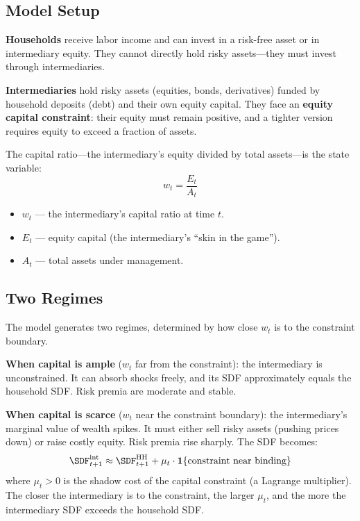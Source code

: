 \subsection{Model Setup}

\textbf{Households} receive labor income and can invest in a risk-free asset or in intermediary equity. They cannot directly hold risky assets---they must invest through intermediaries.

\textbf{Intermediaries} hold risky assets (equities, bonds, derivatives) funded by household deposits (debt) and their own equity capital. They face an \textbf{equity capital constraint}: their equity must remain positive, and a tighter version requires equity to exceed a fraction of assets.

The capital ratio---the intermediary's equity divided by total assets---is the state variable:
\begin{equation}
w_t = \frac{E_t}{A_t}
\label{eq:capital-ratio-hk}
\end{equation}
\begin{itemize}[nosep]
  \item $w_t$ --- the intermediary's capital ratio at time $t$.
  \item $E_t$ --- equity capital (the intermediary's ``skin in the game'').
  \item $A_t$ --- total assets under management.
\end{itemize}

\subsection{Two Regimes}

The model generates two regimes, determined by how close $w_t$ is to the constraint boundary.

\textbf{When capital is ample} ($w_t$ far from the constraint): the intermediary is unconstrained. It can absorb shocks freely, and its SDF approximately equals the household SDF. Risk premia are moderate and stable.

\textbf{When capital is scarce} ($w_t$ near the constraint boundary): the intermediary's marginal value of wealth spikes. It must either sell risky assets (pushing prices down) or raise costly equity. Risk premia rise sharply. The SDF becomes:
\begin{equation}
\SDF_{t+1}^{\text{int}} \approx \SDF_{t+1}^{\text{HH}} + \mu_t \cdot \mathbf{1}\{\text{constraint near binding}\}
\label{eq:hk-sdf}
\end{equation}
where $\mu_t > 0$ is the shadow cost of the capital constraint (a Lagrange multiplier). The closer the intermediary is to the constraint, the larger $\mu_t$, and the more the intermediary SDF exceeds the household SDF.

